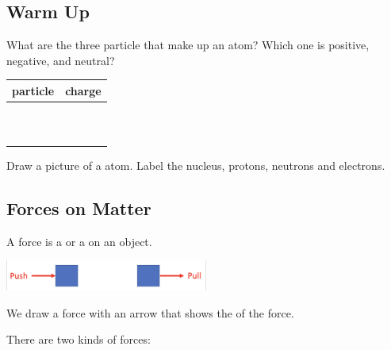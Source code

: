 \documentclass[answers,12pt]{exam}
\begin{document}
\pagebreak

\begin{questions}


    \section*{Warm Up}

    \question What are the three particle that make up an atom? Which one is positive, negative, and neutral?

   \begin{center}
    \begin{tabular}{|c|c|}
        \hline
        particle & charge \\ \hline
        \hspace{2cm} & \hspace{2cm} \\ \hline
        \ & \ \\ \hline
        \ & \ \\ \hline

    \end{tabular}
   \end{center}


    \question Draw a picture of a  atom. Label the nucleus, protons, neutrons and electrons.

    \vspace{3cm}

    \subsection{Forces on Matter}

    \question A force is a \fillin or a \fillin on an object.

  \begin{center}
    \includegraphics[width=0.5\textwidth]{pushpull}
  \end{center}


    \question We draw a force with an arrow that shows the \fillin of the force.
    
    
    \question There are two kinds of forces:
\end{questions}
\end{document}
